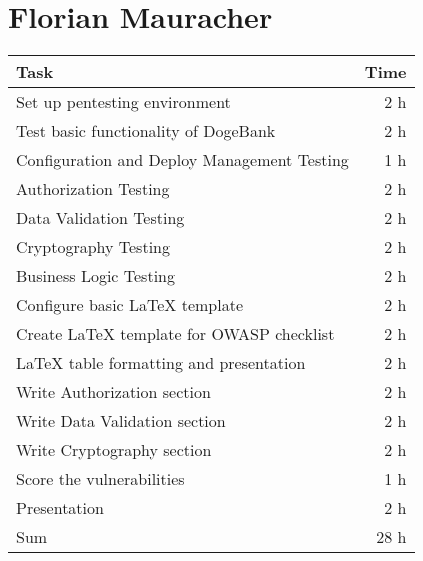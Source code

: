 \section*{Florian Mauracher}
\begin{table}[h!tpb]
  \centering
  \begin{tabularx}{\textwidth}{X r}
    \toprule
      Task & Time \\
    \midrule
      Set up pentesting environment & 2 h \\
      Test basic functionality of DogeBank & 2 h \\
      Configuration and Deploy Management Testing & 1 h \\
      Authorization Testing & 2 h \\
      Data Validation Testing & 2 h \\
      Cryptography Testing & 2 h \\
      Business Logic Testing & 2 h \\
      Configure basic \LaTeX{} template & 2 h \\
      Create \LaTeX{} template for OWASP checklist & 2 h \\
      \LaTeX{} table formatting and presentation & 2 h \\
      Write Authorization section & 2 h \\
      Write Data Validation section & 2 h \\
      Write Cryptography section & 2 h \\
      Score the vulnerabilities & 1 h \\
      Presentation & 2 h \\
    \midrule
      Sum & 28 h \\
    \bottomrule
  \end{tabularx}
\end{table}

\clearpage
